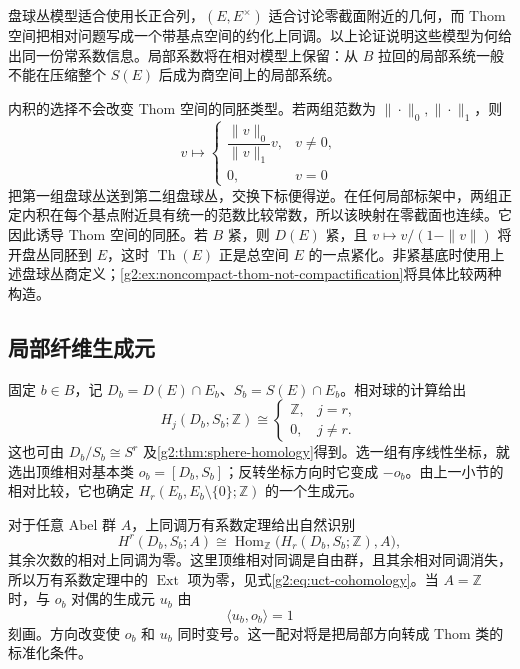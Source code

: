 盘球丛模型适合使用长正合列，\((E,E^\times)\) 适合讨论零截面附近的几何，而 Thom 空间把相对问题写成一个带基点空间的约化上同调。以上论证说明这些模型为何给出同一份常系数信息。局部系数将在相对模型上保留：从 \(B\) 拉回的局部系统一般不能在压缩整个 \(S(E)\) 后成为商空间上的局部系统。

\ProseParagraphBreak

内积的选择不会改变 Thom 空间的同胚类型。若两组范数为 \(\|\cdot\|_0,\|\cdot\|_1\)，则
\[
	v\longmapsto
	\begin{cases}
		\dfrac{\|v\|_0}{\|v\|_1}v,&v\ne0,\\
		0,&v=0
	\end{cases}
\]
把第一组盘球丛送到第二组盘球丛，交换下标便得逆。在任何局部标架中，两组正定内积在每个基点附近具有统一的范数比较常数，所以该映射在零截面也连续。它因此诱导 Thom 空间的同胚。若 \(B\) 紧，则 \(D(E)\) 紧，且 \(v\mapsto v/(1-\|v\|)\) 将开盘丛同胚到 \(E\)，这时 \(\operatorname{Th}(E)\) 正是总空间 \(E\) 的一点紧化。非紧基底时使用上述盘球丛商定义；\cref{g2:ex:noncompact-thom-not-compactification}将具体比较两种构造。

\subsection{局部纤维生成元}
\label{g2:subsec:2001:02}
固定 \(b\in B\)，记 \(D_b=D(E)\cap E_b\)、\(S_b=S(E)\cap E_b\)。相对球的计算给出
\begin{equation}\label{g2:eq:fiber-orientation-group}
	H_j(D_b,S_b;\mathbb Z)\cong
	\begin{cases}
		\mathbb Z,&j=r,\\
		0,&j\ne r.
	\end{cases}
\end{equation}
这也可由 \(D_b/S_b\cong S^r\) 及\cref{g2:thm:sphere-homology}得到。选一组有序线性坐标，就选出顶维相对基本类 \(o_b=[D_b,S_b]\)；反转坐标方向时它变成 \(-o_b\)。由上一小节的相对比较，它也确定 \(H_r(E_b,E_b\setminus\{0\};\mathbb Z)\) 的一个生成元。

\ProseParagraphBreak

对于任意 Abel 群 \(A\)，上同调万有系数定理给出自然识别
\begin{equation}\label{g2:eq:fiber-top-cohomology-hom}
	H^r(D_b,S_b;A)\cong\operatorname{Hom}_{\mathbb Z}\bigl(H_r(D_b,S_b;\mathbb Z),A\bigr),
\end{equation}
其余次数的相对上同调为零。这里顶维相对同调是自由群，且其余相对同调消失，所以万有系数定理中的 \(\operatorname{Ext}\) 项为零，见式\eqref{g2:eq:uct-cohomology}。当 \(A=\mathbb Z\) 时，与 \(o_b\) 对偶的生成元 \(u_b\) 由
\[
	\langle u_b,o_b\rangle=1
\]
刻画。方向改变使 \(o_b\) 和 \(u_b\) 同时变号。这一配对将是把局部方向转成 Thom 类的标准化条件。

